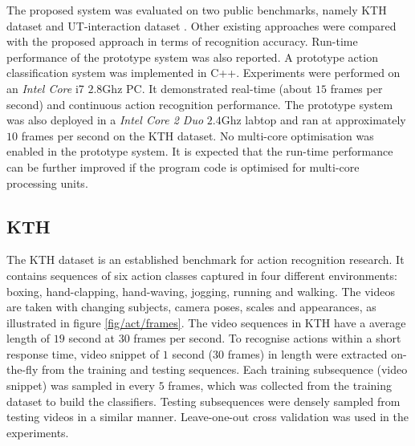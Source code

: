The proposed system was evaluated on two public benchmarks, namely KTH dataset \cite{Schuldt2004} and UT-interaction dataset \cite{Ryoo2010}. 
Other existing approaches were compared with the proposed approach in terms of recognition accuracy. 
Run-time performance of the prototype system was also reported. A prototype action classification system was implemented in C++. Experiments were performed on an \emph{Intel Core}\texttrademark \; i7 $2.8$Ghz PC. It demonstrated real-time (about $15$ frames per second) and continuous action recognition performance. 
The prototype system was also deployed in a \emph{Intel Core 2 Duo} $2.4$Ghz labtop and ran at approximately $10$ frames per second on the KTH dataset. 
No multi-core optimisation was enabled in the prototype system. It is expected that the run-time performance can be further improved if the program code is optimised for multi-core processing units.



\subsection{KTH}

The KTH dataset is an established benchmark for action recognition research. 
It contains sequences of six action classes captured in four different environments: boxing, hand-clapping, hand-waving, jogging, running and walking. 
The videos are taken with changing subjects, camera poses, scales and appearances, as illustrated in figure \ref{fig/act/frames}. 
The video sequences in KTH have a average length of $19$ second at $30$ frames per second. 
To recognise actions within a short response time, video snippet of $1$ second ($30$ frames) in length were extracted on-the-fly from the training and testing sequences. 
Each training subsequence (video snippet) was sampled in every $5$ frames, which was collected from the training dataset to build the classifiers. 
Testing subsequences were densely sampled from testing videos in a similar manner. 
Leave-one-out cross validation was used in the experiments. 


